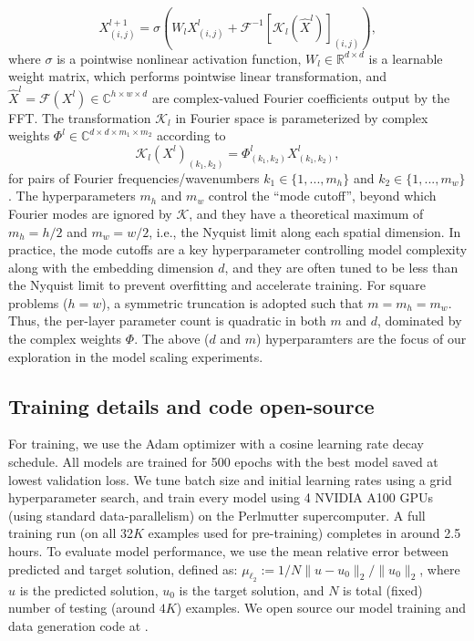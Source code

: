 \begin{equation}
    X^{l+1}_{(i,j)} = \sigma ( W_l X^{l}_{(i,j)} + \mathcal{F}^{-1}[\mathcal{K}_l(\hat{X}^{l})]_{(i,j)}), 
\end{equation}
where $\sigma$ is a pointwise nonlinear activation function, $W_l \in\mathbb{R}^{d\times d}$ is a learnable weight matrix, which performs pointwise linear transformation, and $\hat{X}^l = \mathcal{F}(X^{l}) \in \mathbb{C}^{h\times w \times d}$ are complex-valued Fourier coefficients output by the FFT. The transformation $\mathcal{K}_l$ in Fourier space is parameterized by complex weights $\Phi^l \in \mathbb{C}^{d\times d \times m_1 \times m_2}$ according to
\begin{equation}
    \mathcal{K}_l(X^l)_{(k_1, k_2)} = \Phi^l_{(k_1,k_2)} X^l_{(k_1,k_2)},
\end{equation}
for pairs of Fourier frequencies/wavenumbers $k_1 \in \{1, ..., m_h\}$ and $k_2 \in \{1,..., m_w\}$. The hyperparameters $m_h$ and $m_w$ control the ``mode cutoff'', beyond which Fourier modes are ignored by $\mathcal{K}$, and they have a theoretical maximum of $m_h=h/2$ and $m_w=w/2$, i.e., the Nyquist limit along each spatial dimension. In practice, the mode cutoffs are a key hyperparameter controlling model complexity along with the embedding dimension $d$, and they are often tuned to be less than the Nyquist limit to prevent overfitting and accelerate training. For square problems ($h=w$), a symmetric truncation is adopted such that $m=m_h=m_w$. Thus, the per-layer parameter count is quadratic in both $m$ and $d$, dominated by the complex weights $\Phi$. 
The above ($d$ and $m$) hyperparamters are the focus of our exploration in the model scaling experiments.

\subsection{Training details and code open-source}
\label{sec:training_details}
For training, we use the Adam optimizer with a cosine learning rate decay schedule. All models are trained for 500 epochs with the best model saved at lowest validation loss. 
We tune batch size and initial learning rates using a grid hyperparameter search, and train every model using 4 NVIDIA A100 GPUs (using standard data-parallelism) on the Perlmutter supercomputer. A full training run (on all 32$K$ examples used for pre-training) completes in around 2.5 hours. To evaluate model performance, we use the mean relative error between predicted and target solution, defined as: $\mu_{\ell_2} := 1/N \| u - u_0\|_2 / \|u_0\|_2$, where $u$ is the predicted solution, $u_0$ is the target solution, and $N$ is total (fixed) number of testing  (around $4K$) examples. We open source our model training and data generation code at \cite{github}.

